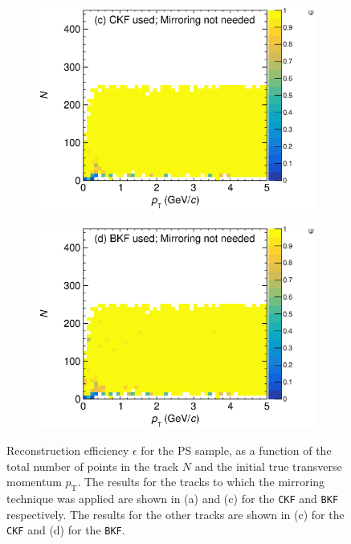 \begin{figure}[!ht]
          \begin{subfigure}[b]{0.48\textwidth}
         \centering
         \includegraphics[width=\textwidth]{figures/ch5-KF_NDGAr/ToySample/ParScan/testNDGArMirrorEfficiencyVSNPointsVSpT_NoMirror.eps}
         \caption{}
         \label{fig:PS_Eff_CKF_NoMirror}
     \end{subfigure}
     \begin{subfigure}[b]{0.48\textwidth}
         \centering
         \includegraphics[width=\textwidth]{figures/ch5-KF_NDGAr/ToySample/ParScan/testNDGArMirrorEfficiencyVSNPointsVSpT_BKF_NoMirror.eps}
         \caption{}
         \label{fig:PS_Eff_BKF_NoMirror}
     \end{subfigure}
        \caption[Reconstruction efficiency $\epsilon$ for the PS sample.]{ Reconstruction efficiency $\epsilon$ for the PS sample, as a function of the total number of points in the track $N$ and the initial true transverse momentum $p_\textrm{T}$. The results for the tracks to which the mirroring technique was applied are shown in (a) and (c) for the \texttt{CKF} and \texttt{BKF} respectively. The results for the other tracks are shown in (c) for the \texttt{CKF} and (d) for the \texttt{BKF}.} \label{fig:PS_Eff}
\end{figure}


